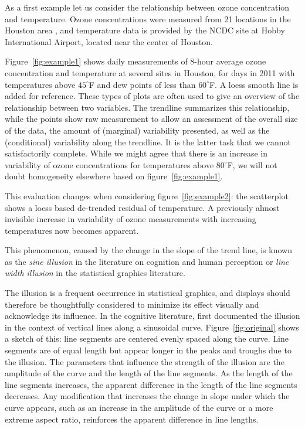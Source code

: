 \documentclass[11pt]{isuthesis}\usepackage[]{graphicx}\usepackage[]{color}
\begin{document}
As a first example let us consider the relationship between ozone concentration and temperature. Ozone concentrations were measured from 21 locations in the Houston area \citep{epa}, and temperature data is provided by the NCDC \citep{noaa} site at Hobby International Airport, located near the center of Houston. 

Figure~\ref{fig:example1} shows daily measurements of 8-hour average ozone concentration and temperature at several sites in Houston, for days in 2011 with temperatures above $45^\circ$F  and dew points of less than $60^\circ$F. 
A loess smooth line is added for reference. 
These types of plots are often used to give an overview of the relationship between two variables. The trendline summarizes this relationship, while the points show raw measurement to allow an assessment of the overall size of the data, the amount of (marginal) variability presented, as well as the (conditional) variability along the trendline. It is the latter task that we cannot satisfactorily complete. While we might agree that there is an increase in variability of ozone concentrations for temperatures above $80^\circ$F, we will not doubt homogeneity  elsewhere based on figure~\ref{fig:example1}. 


This evaluation changes when considering figure~\ref{fig:example2}: the scatterplot shows a loess based de-trended residual of temperature. A previously almost invisible increase in variability of ozone measurements with increasing temperatures now becomes apparent.

This phenomenon, caused by the change in the slope of the trend line,  is  known as the  {\it sine illusion} in the literature on cognition and human perception  or {\it line width illusion} in the statistical graphics literature. 

The illusion is a frequent occurrence in statistical graphics, and  displays should therefore be thoughtfully considered to minimize its effect visually and acknowledge its influence. 
In the cognitive literature, \citet{day:1991} first documented the illusion in the context of vertical lines along a sinusoidal curve. Figure~\ref{fig:original} shows a sketch of this: line segments are centered evenly spaced along the curve. Line segments are of equal length but appear longer in the peaks and troughs due to the illusion. The parameters that influence the strength of the illusion are the amplitude of the curve and the length of the line segments. As the length of the line segments increases,  the apparent difference in the length of the line segments decreases. Any modification that increases the change in slope under which the curve appears, such as an increase in the amplitude of the curve or a more extreme aspect ratio, reinforces the apparent difference in line lengths. 
\end{document}
